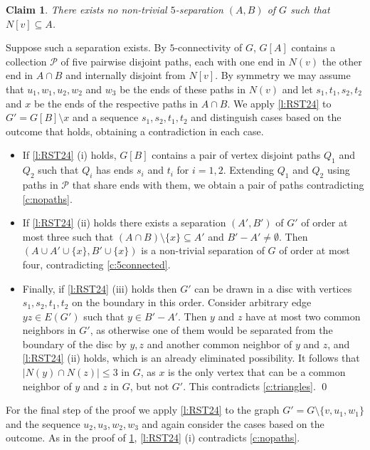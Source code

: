 \documentclass[reqno,final,12pt]{amsart}
\newtheorem{claim}{Claim}[section]
\newcommand{\mc}[1]{\mathcal{#1}}
\begin{document}
{\begin{claim}\label{c:no5separation} There exists no non-trivial $5$-separation $(A,B)$ of $G$ such that $N[v] \subseteq A$.
\end{claim}	

	Suppose such a separation exists. By $5$-connectivity of $G$, $G[A]$ contains a collection $\mc{P}$ of five pairwise disjoint paths, each with one end in $N(v)$  the other end in $A \cap B$ and internally disjoint from $N[v]$. By symmetry we may assume that $u_1,w_1,u_2,w_2$ and $w_3$ be the ends of these paths in $N(v)$ and let $s_1,t_1,s_2,t_2$ and $x$ be the ends of the respective paths in $A \cap B$. We
	apply \cref{l:RST24} to $G'=G[B] \setminus x$ and  a sequence $s_1,s_2,t_1,t_2$ and distinguish cases based on the outcome that holds, obtaining a contradiction in each case.
	\begin{itemize}
		\item  If \cref{l:RST24} (i) holds, $G[B]$ contains a pair of vertex disjoint paths $Q_1$ and $Q_2$ such that $Q_i$ has ends $s_i$ and $t_i$ for $i=1,2$. Extending $Q_1$ and $Q_2$ using paths in $\mc{P}$ that share ends with them, we obtain a pair of paths contradicting \cref{c:nopaths}. 
		\item  If \cref{l:RST24} (ii) holds there exists a separation $(A',B')$ of $G'$ of order at most three such that $(A \cap B) \setminus \{x\} \subseteq A'$ and $B' -A' \neq \emptyset$. Then $(A \cup A' \cup \{x\}, B' \cup \{x\})$ is a non-trivial separation of $G$ of order at most four, contradicting \cref{c:5connected}.
		\item Finally, if \cref{l:RST24} (iii) holds then $G'$ can be drawn in a disc with vertices $s_1,s_2,t_1,t_2$ on the boundary in this order. Consider arbitrary edge  $yz \in E(G')$ such that $y \in B'-A'$. Then $y$ and $z$ have at most two common neighbors in $G'$, as otherwise one of them would be separated from the boundary of the disc by $y,z$  and another common neighbor of $y$ and $z$, and  \cref{l:RST24} (ii) holds, which is an already eliminated possibility. It follows that $|N(y) \cap N(z)| \leq 3$ in $G$, as $x$ is the only vertex that can be a common neighbor of $y$ and $z$ in $G$, but not $G'$. This contradicts \cref{c:triangles}. 		 \qed
	\end{itemize}  		    
\vskip 5pt

For the final step of the proof 
we apply \cref{l:RST24} to the graph $G' = G \setminus \{v,u_1,w_1\}$ and the sequence $u_2,u_3,w_2,w_3$ and again consider the cases based on the outcome. As in the proof of \cref{c:no5separation},  \cref{l:RST24} (i) contradicts \cref{c:nopaths}.

}
\end{document}
